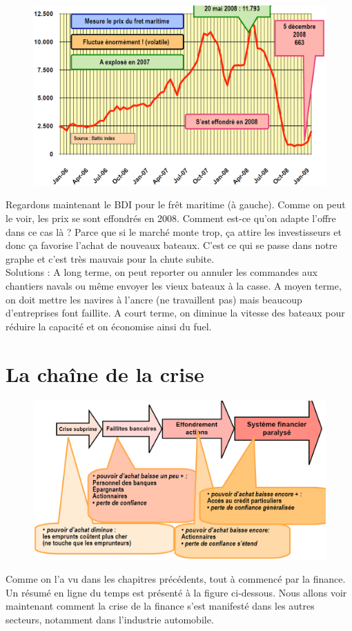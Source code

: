 \begin{figure}
\includegraphics[scale=0.3]{14}
\end{figure}  
Regardons maintenant le BDI pour le frêt maritime (à gauche). Comme on peut le voir, les prix se sont effondrés en 2008. Comment est-ce qu'on adapte l'offre dans ce cas là ? Parce que si le marché monte trop, ça attire les investisseurs et donc ça favorise l'achat de nouveaux bateaux. C'est ce qui se passe dans notre graphe et c'est très mauvais pour la chute subite. \\
Solutions : A long terme, on peut reporter ou annuler les commandes aux chantiers navals ou même envoyer les vieux bateaux à la casse. A moyen terme, on doit mettre les navires à l'ancre (ne travaillent pas) mais beaucoup d'entreprises font faillite. A court terme, on diminue la vitesse des bateaux pour réduire la capacité et on économise ainsi du fuel. 

\section{La chaîne de la crise}
\begin{figure}
\includegraphics[scale=0.3]{15}
\end{figure}
Comme on l'a vu dans les chapitres précédents, tout à commencé par la finance. Un résumé en ligne du temps est présenté à la figure ci-dessous. Nous allons voir maintenant comment la crise de la finance s'est manifesté dans les autres secteurs, notamment dans l'industrie automobile.\\\\

